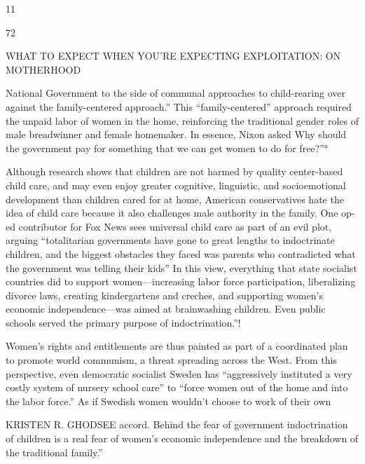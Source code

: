  \par 
11
 \par 
72
 \par 
WHAT TO EXPECT WHEN YOU'RE EXPECTING EXPLOITATION: ON MOTHERHOOD
 \par 
National Government to the side of communal approaches to child-rearing over against the family-centered approach.” This “family-centered” approach required the unpaid labor of women in the home, reinforcing the traditional gender roles of male breadwinner and female homemaker. In essence, Nixon asked Why should the government pay for something that we can get women to do for free?”°
 \par 
Although research shows that children are not harmed by quality center-based child care, and may even enjoy greater cognitive, linguistic, and socioemotional development than children cared for at home, American conservatives hate the idea of child care because it also challenges male authority in the family. One op-ed contributor for Fox News sees universal child care as part of an evil plot, arguing “totalitarian governments have gone to great lengths to indoctrinate children, and the biggest obstacles they faced was parents who contradicted what the government was telling their kids” In this view, everything that state socialist countries did to support women—increasing labor force participation, liberalizing divorce laws, creating kindergartens and creches, and supporting women’s economic independence—was aimed at brainwashing children. Even public schools served the primary purpose of indoctrination.”!
 \par 
Women’s rights and entitlements are thus painted as part of a coordinated plan to promote world communism, a threat spreading across the West. From this perspective, even democratic socialist Sweden has “aggressively instituted a very costly system of nursery school care” to “force women out of the home and into the labor force.” As if Swedish women wouldn't choose to work of their own
 \par 
KRISTEN R. GHODSEE accord. Behind the fear of government indoctrination of children is a real fear of women’s economic independence and the breakdown of the traditional family.”
 \par 
